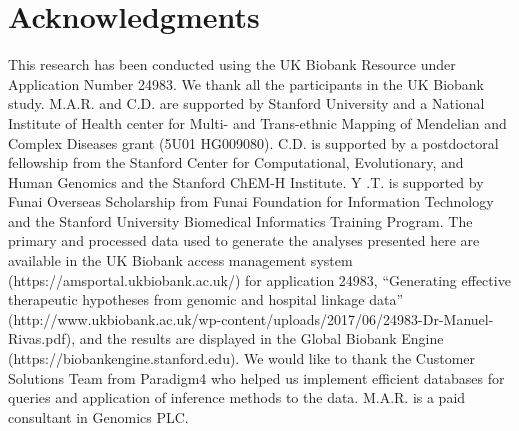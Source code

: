 \section*{Acknowledgments}
This research has been conducted using the UK Biobank Resource under Application Number 24983. We thank all the participants in the UK Biobank study. M.A.R. and C.D. are supported by Stanford University and a National Institute of Health center for Multi- and Trans-ethnic Mapping of Mendelian and Complex Diseases grant (5U01 HG009080). C.D. is supported by a postdoctoral fellowship from the Stanford Center for Computational, Evolutionary, and Human Genomics and the Stanford ChEM-H Institute. Y .T. is supported by Funai Overseas Scholarship from Funai Foundation for Information Technology and the Stanford University Biomedical Informatics Training Program. The primary and processed data used to generate the analyses presented here are available in the UK Biobank access management system (https://amsportal.ukbiobank.ac.uk/) for application 24983, ``Generating effective therapeutic hypotheses from genomic and hospital linkage data'' (http://www.ukbiobank.ac.uk/wp-content/uploads/2017/06/24983-Dr-Manuel-Rivas.pdf), and the results are displayed in the Global Biobank Engine (https://biobankengine.stanford.edu). We would like to thank the Customer Solutions Team from Paradigm4 who helped us implement efficient databases for queries and application of inference methods to the data. M.A.R. is a paid consultant in Genomics PLC.

\nolinenumbers

% 

%
%
% 

